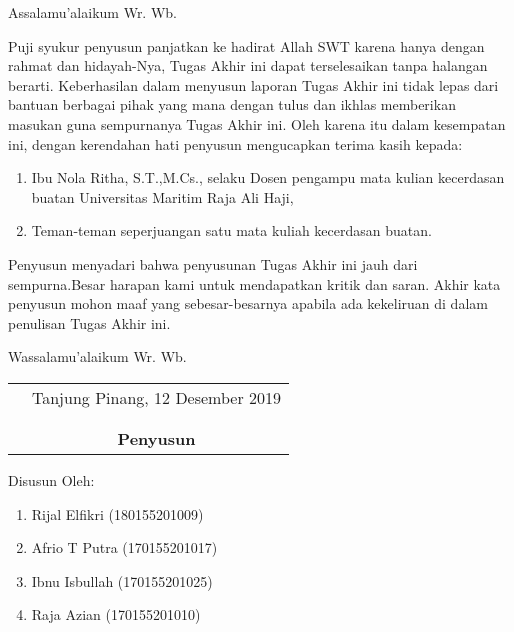 \documentclass{jtetiskripsi}
\begin{document}
\cover


\preface
Assalamu'alaikum Wr. Wb.

\vspace{0.5cm}

Puji syukur penyusun panjatkan ke hadirat Allah SWT karena hanya dengan rahmat dan hidayah-Nya, Tugas Akhir ini dapat terselesaikan tanpa halangan berarti. Keberhasilan dalam menyusun laporan Tugas Akhir ini tidak lepas dari bantuan berbagai pihak yang mana dengan tulus dan ikhlas memberikan masukan guna sempurnanya Tugas Akhir ini. Oleh karena itu dalam kesempatan ini, dengan kerendahan hati penyusun mengucapkan terima kasih kepada:

\begin{enumerate}
\item{Ibu Nola Ritha, S.T.,M.Cs., selaku Dosen pengampu mata kulian kecerdasan buatan Universitas Maritim Raja Ali Haji},
\item Teman-teman seperjuangan satu mata kuliah kecerdasan buatan.

\end{enumerate}


Penyusun menyadari bahwa penyusunan Tugas Akhir ini jauh dari sempurna.Besar harapan kami untuk mendapatkan kritik dan saran. Akhir kata penyusun mohon maaf yang sebesar-besarnya apabila ada kekeliruan di dalam penulisan Tugas Akhir ini.

\vspace{0.5cm}

Wassalamu'alaikum Wr. Wb.

\begin{tabular}{p{7.5cm}c}
&Tanjung Pinang, 12 Desember 2019\\
&\\
&\\
&\textbf{Penyusun}
\end{tabular}

\newpage
\noindent Disusun Oleh:
\begin{enumerate}
	\item Rijal Elfikri (180155201009)
	\item Afrio T Putra (170155201017)
	\item Ibnu Isbullah (170155201025)
	\item Raja Azian (170155201010)
\end{enumerate}
\end{document}
